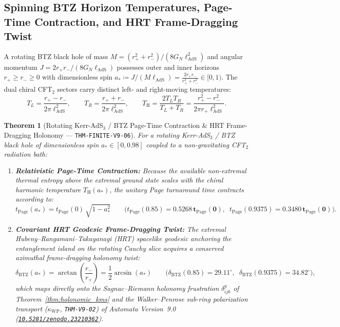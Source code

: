 \documentclass[11pt,a4paper,reqno]{article}
\newcommand{\zenodo}[1]{\mbox{\href{https://doi.org/10.5281/zenodo.#1}{\texttt{10.5281/zenodo.#1}}}}
\theoremstyle{plain}
\newtheorem{theorem}{Theorem}[section]
\theoremstyle{definition}
\theoremstyle{remark}
\numberwithin{equation}{section}
\begin{document}
\subsection{Spinning BTZ Horizon Temperatures, Page-Time Contraction, and HRT Frame-Dragging Twist}
A rotating BTZ black hole of mass $M = (r_+^2 + r_-^2)/(8G_N\ell_{\mathrm{AdS}}^2)$ and angular momentum $J = 2r_+ r_-/(8G_N\ell_{\mathrm{AdS}})$ possesses outer and inner horizons $r_+ \ge r_- \ge 0$ with dimensionless spin $a_* \coloneqq J/(M\ell_{\mathrm{AdS}}) = \frac{2r_+ r_-}{r_+^2 + r_-^2} \in [0, 1)$. The dual chiral CFT$_2$ sectors carry distinct left- and right-moving temperatures:
\begin{equation}
\label{eq:btz_chiral_temperatures}
T_L = \frac{r_+ - r_-}{2\pi\ell_{\mathrm{AdS}}^2}, \qquad
T_R = \frac{r_+ + r_-}{2\pi\ell_{\mathrm{AdS}}^2}, \qquad
T_{\mathrm{H}} = \frac{2 T_L T_R}{T_L + T_R} = \frac{r_+^2 - r_-^2}{2\pi r_+ \ell_{\mathrm{AdS}}^2}.
\end{equation}

\begin{theorem}[{Rotating Kerr-AdS$_3$ / BTZ Page-Time Contraction \& HRT Frame-Dragging Holonomy --- \texttt{THM-FINITE-V9-06}}]
\label{thm:v9_kerr_ads3_bridge}
For a rotating Kerr-AdS$_3$ / BTZ black hole of dimensionless spin $a_* \in [0, 0.98]$ coupled to a non-gravitating CFT$_2$ radiation bath:
\begin{enumerate}
    \item \textbf{Relativistic Page-Time Contraction:} Because the available non-extremal thermal entropy above the extremal ground state scales with the chiral harmonic temperature $T_{\mathrm{H}}(a_*)$, the unitary Page turnaround time contracts according to:
    \begin{equation}
    \label{eq:spinning_page_time}
    t_{\mathrm{Page}}(a_*) = t_{\mathrm{Page}}(0)\,\sqrt{1 - a_*^2} \qquad \bigl(t_{\mathrm{Page}}(0.85) = \bm{0.5268\,t_{\mathrm{Page}}(0)},\;\; t_{\mathrm{Page}}(0.9375) = \bm{0.3480\,t_{\mathrm{Page}}(0)}\bigr).
    \end{equation}
    \item \textbf{Covariant HRT Geodesic Frame-Dragging Twist:} The extremal Hubeny--Rangamani--Takayanagi (HRT) spacelike geodesic anchoring the entanglement island on the rotating Cauchy slice acquires a conserved azimuthal frame-dragging holonomy twist:
    \begin{equation}
    \label{eq:hrt_holonomy_twist}
    \delta_{\mathrm{BTZ}}(a_*) = \arctan\!\left(\frac{r_-}{r_+}\right) = \frac{1}{2}\arcsin(a_*) \qquad \bigl(\delta_{\mathrm{BTZ}}(0.85) = \bm{29.11^\circ},\;\; \delta_{\mathrm{BTZ}}(0.9375) = \bm{34.82^\circ}\bigr),
    \end{equation}
    which maps directly onto the Sagnac--Riemann holonomy frustration $\delta_{ijk}^g$ of Theorem~\ref{thm:holonomic_kms} and the Walker--Penrose sub-ring polarization transport ($\kappa_{\mathrm{WP}}$, \texttt{THM-V9-02}) of Automata Version~9.0 (\zenodo{23210362}).
\end{enumerate}
\end{theorem}
\end{document}
